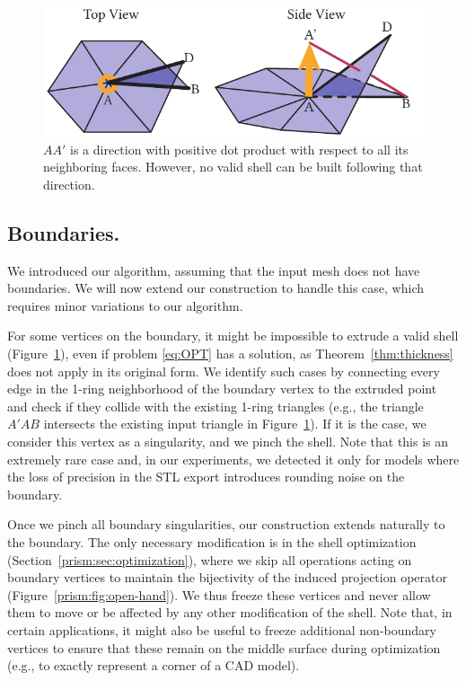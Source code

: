 \begin{figure}
    \centering
    \includegraphics[width=0.9\linewidth]{prism-tex/figs/boundary_singular}
    \caption{$AA'$ is a direction with positive dot product with respect to all its neighboring faces. However, no valid shell can be built following that direction.}
    \label{prism:fig:boundary_singularity}
    
\end{figure}

\subsection{Boundaries.}\label{prism:sec:boundaries}

We introduced our algorithm, assuming that the input mesh does not have boundaries. We will now extend our construction to handle this case, which requires minor variations to our algorithm.

For some vertices on the boundary, it might be impossible to extrude a valid shell (Figure~\ref{prism:fig:boundary_singularity}), even if problem \eqref{eq:OPT} has a solution, as  Theorem~\ref{thm:thickness} does not apply in its original form. 
%
We identify such cases by connecting every edge in the 1-ring neighborhood of the boundary vertex
to the extruded point and check if they collide with the existing 1-ring triangles (e.g., the triangle $A'AB$ intersects the existing input triangle in Figure~\ref{prism:fig:boundary_singularity}). If it is the case, we consider this vertex as a singularity, and we pinch the shell. Note that this is an extremely rare case and, in our experiments, we detected it only for models where the loss of precision in the STL export introduces rounding noise on the boundary.%

Once we pinch all boundary singularities, our construction extends naturally to the boundary. The only necessary modification is in the shell optimization (Section~\ref{prism:sec:optimization}), where we skip all operations acting on boundary vertices to maintain the bijectivity of the induced projection operator (Figure~\ref{prism:fig:open-hand}).
%
We thus freeze these vertices and never allow them to move or be affected by any other modification of the shell. Note that, in certain applications, it might also be useful to freeze additional non-boundary vertices to ensure that these remain on the middle surface during optimization (e.g., to exactly represent a corner of a CAD model).


